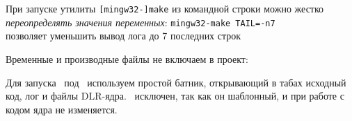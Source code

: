 \bigskip
При запуске утилиты \verb|[mingw32-]make| из командной строки можно
жестко \emph{переопределять значения переменных}:
\verb|mingw32-make TAIL=-n7|\\
позволяет уменьшить вывод лога до 7 последних строк

\bigskip
Временные и производные файлы не включаем в проект:

Для запуска \gvim\ под \win\ используем простой батник, открывающий в табах
исходный код, лог и файлы DLR-ядра. \ исключен, так как он
шаблонный, и при работе с кодом ядра не изменяется.
 
\secup
